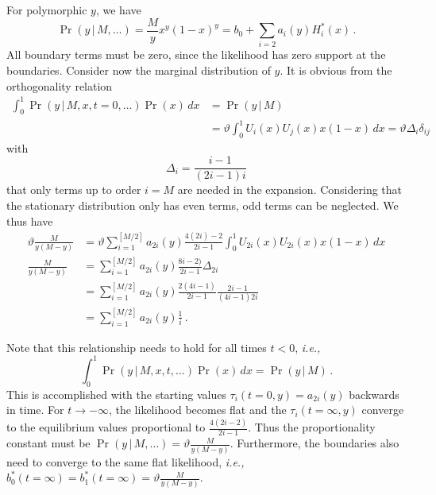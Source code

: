 \documentclass[preprint]{elsarticle}
\newcommand\given{{\,|\,}}
\newcommand\ie{{\it i.e.,}}
\begin{document}
For polymorphic $y$, we have
\begin{equation}
    \Pr(y\given M,\dots)=\frac{M}{y}x^{y}(1-x)^y=b_0+\sum_{i=2} a_i(y) H_i^{*}(x)\,.
\end{equation}
All boundary terms must be zero, since the likelihood has zero support at the boundaries.
Consider now the marginal distribution of $y$. It is obvious from the orthogonality relation 
\begin{equation}
\begin{split}
    \int_0^1 \Pr(y\given M, x, t=0,\dots)\Pr(x)\,dx&=\Pr(y\given M)\\
    &=\vartheta\int_0^1 U_i(x)U_j(x)x(1-x)\,dx=\vartheta\Delta_i \delta_{ij}
\end{split}
\end{equation}
with
\begin{equation}
    \Delta_i = \frac{i-1}{(2i-1)i}
\end{equation}
that only terms up to order $i=M$ are needed in the expansion. Considering that the stationary distribution only has even terms, odd terms can be neglected. We thus have
\begin{equation}
\begin{split}
    \vartheta\frac{M}{y(M-y)}&=\vartheta\sum_{i=1}^{[M/2]}a_{2i}(y)\frac{4(2i)-2}{2i-1}\int_0^1U_{2i}(x)U_{2i}(x) x(1-x)\,dx\\
    \frac{M}{y(M-y)}&=\sum_{i=1}^{[M/2]}a_{2i}(y)\frac{8i-2)}{2i-1}\Delta_{2i}\\
    &=\sum_{i=1}^{[M/2]}a_{2i}(y)\frac{2(4i-1)}{2i-1}\frac{2i-1}{(4i-1)2i}\\
    &=\sum_{i=1}^{[M/2]}a_{2i}(y)\frac{1}{i}\,.
\end{split}
\end{equation}

Note that this relationship needs to hold for all times $t<0$, \ie\ 
\begin{equation}\label{eq:inner_product}
    \int_0^1 \Pr(y\given M, x, t,\dots)\Pr(x)\,dx=\Pr(y\given M)\,.
\end{equation} 
This is accomplished with the starting values $\tau_i(t=0,y)=a_{2i}(y)$ backwards in time. For $t\to -\infty$, the likelihood becomes flat and the $\tau_i(t=\infty,y)$ converge to the equilibrium values proportional to $\frac{4(2i-2)}{2i-1}$. Thus the proportionality constant must be $\Pr(y\given M,\dots)=\vartheta \frac{M}{y(M-y)}$. Furthermore, the boundaries also need to converge to the same flat likelihood, \ie\ $b_0^{*}(t=\infty)=b_1^{*}(t=\infty)=\vartheta \frac{M}{y(M-y)}$. 
\end{document}
